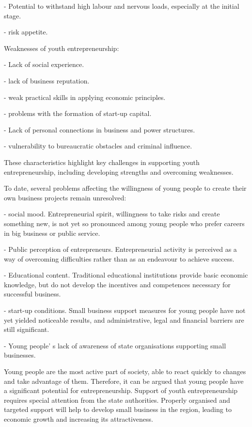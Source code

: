 \begin{multicols}{2}
- Potential to withstand high labour and nervous loads, especially at
the initial stage.

- risk appetite.

Weaknesses of youth entrepreneurship:

- Lack of social experience.

- lack of business reputation.

- weak practical skills in applying economic principles.

- problems with the formation of start-up capital.

- Lack of personal connections in business and power structures.

- vulnerability to bureaucratic obstacles and criminal influence.

These characteristics highlight key challenges in supporting youth
entrepreneurship, including developing strengths and overcoming
weaknesses.

To date, several problems affecting the willingness of young people to
create their own business projects remain unresolved:

- social mood. Entrepreneurial spirit, willingness to take risks and
create something new, is not yet so pronounced among young people who
prefer careers in big business or public service.

- Public perception of entrepreneurs. Entrepreneurial activity is
perceived as a way of overcoming difficulties rather than as an
endeavour to achieve success.

- Educational content. Traditional educational institutions provide
basic economic knowledge, but do not develop the incentives and
competences necessary for successful business.

- start-up conditions. Small business support measures for young people
have not yet yielded noticeable results, and administrative, legal and
financial barriers are still significant.

- Young people' s lack of awareness of state
organisations supporting small businesses.

Young people are the most active part of society, able to react quickly
to changes and take advantage of them. Therefore, it can be argued that
young people have a significant potential for entrepreneurship. Support
of youth entrepreneurship requires special attention from the state
authorities. Properly organised and targeted support will help to
develop small business in the region, leading to economic growth and
increasing its attractiveness.


\end{multicols}
